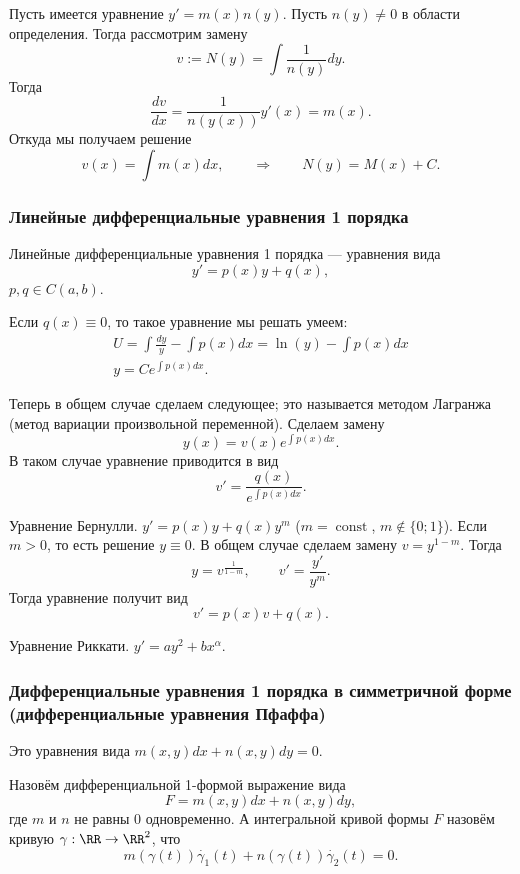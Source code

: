 \documentclass[12pt,a4paper]{article}
\DeclareMathOperator{\const}{const}
\begin{document}
    \begin{example}
        Пусть имеется уравнение $y' = m(x) n(y)$. Пусть $n(y) \neq 0$ в области определения. Тогда рассмотрим замену
        \[v := N(y) = \int \frac{1}{n(y)}dy.\]
        Тогда
        \[\frac{dv}{dx} = \frac{1}{n(y(x))} y'(x) = m(x).\]
        Откуда мы получаем решение
        \[v(x) = \int m(x) dx, \qquad \Longrightarrow \qquad N(y) = M(x) + C.\]
    \end{example}

    \subsubsection{Линейные дифференциальные уравнения 1 порядка}

    Линейные дифференциальные уравнения 1 порядка --- уравнения вида
    \[y' = p(x)y + q(x),\]
    $p, q \in C(a, b)$.

    Если $q(x) \equiv 0$, то такое уравнение мы решать умеем:
    \begin{gather*}
        U = \int \frac{dy}{y} - \int p(x) dx = \ln(y) - \int p(x) dx\\
        y = C e^{\int p(x) dx}.
    \end{gather*}

    Теперь в общем случае сделаем следующее; это называется методом Лагранжа (метод вариации произвольной переменной). Сделаем замену
    \[y(x) = v(x) e^{\int p(x) dx}.\]
    В таком случае уравнение приводится в вид
    \[v' = \frac{q(x)}{e^{\int p(x) dx}}.\]

    Уравнение Бернулли. $y' = p(x) y + q(x) y^m$ ($m = \const$, $m \notin \{0; 1\}$). Если $m > 0$, то есть решение $y \equiv 0$. В общем случае сделаем замену $v = y^{1-m}$. Тогда
    \[y = v^{\frac{1}{1-m}}, \qquad v' = \frac{y'}{y^m}.\]
    Тогда уравнение получит вид
    \[v' = p(x)v + q(x).\]

    Уравнение Риккати. $y' = a y^2 + b x^\alpha$.

    \subsubsection{Дифференциальные уравнения 1 порядка в симметричной форме (дифференциальные уравнения Пфаффа)}

    Это уравнения вида $m(x, y) dx + n(x, y) dy = 0$.

    Назовём дифференциальной 1-формой выражение вида
    \[F = m(x, y) dx + n(x, y) dy,\]
    где $m$ и $n$ не равны $0$ одновременно. А интегральной кривой формы $F$ назовём кривую $\gamma: \RR \to \RR^2$, что
    \[m(\gamma(t)) \dot{\gamma_1}(t) + n(\gamma(t)) \dot{\gamma_2}(t) = 0.\]
\end{document}
